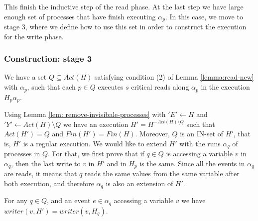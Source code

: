 This finish the inductive step of the read phase. At the last step we have large enough set of processes that have finish executing $\alpha_p$. In this case, we move to stage 3, where we define how to use this set in order to construct the execution for the write phase.



\subsubsection{Construction: stage 3}

We have a set $Q \subseteq Act(H)$ satisfying condition (2) of Lemma \ref{lemma:read-new} with $\alpha_p$, such that each $p \in Q$ executes $s$ critical reads along $\alpha_p$ in the execution $H_p \alpha_p$.

Using Lemma \ref{lem: remove-invisibale-processes} with $'E' \leftarrow H$ and $'Y' \leftarrow Act(H) \setminus Q$ we have an execution $H' = H^{-Act(H) \setminus Q}$ such that $Act(H') = Q$ and $Fin(H') = Fin(H)$. Moreover, $Q$ is an IN-set of $H'$, that is, $H'$ is a regular execution.
We would like to extend $H'$ with the runs $\alpha_q$ of processes in $Q$. For that, we first prove that if $q \in Q$ is accessing a variable $v$ in $\alpha_q$, then the last write to $v$ in $H'$ and in $H_p$ is the same. Since all the events in $\alpha_q$ are reads, it means that $q$ reads the same values from the same variable after both execution, and therefore $\alpha_q$ is also an extension of $H'$.

\begin{claim-subsection}
	For any $q \in Q$, and an event $e \in \alpha_q$ accessing a variable $v$ we have $writer(v,H') = writer(v,H_q)$.
\end{claim-subsection}

